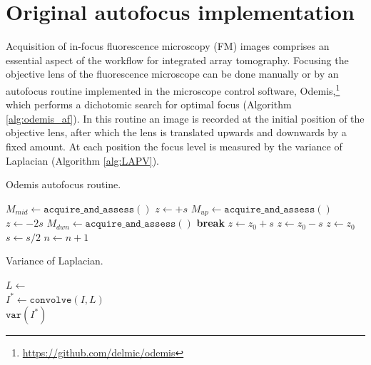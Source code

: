 \section{Original autofocus implementation}
\label{sec:A.1_title}

Acquisition of in-focus fluorescence microscopy (FM) images comprises an essential aspect of the workflow for integrated array tomography. Focusing the objective lens of the fluorescence microscope can be done manually or by an autofocus routine implemented in the microscope control software, Odemis,\footnote{\href{https://github.com/delmic/odemis}{https://github.com/delmic/odemis}} which performs a dichotomic search for optimal focus (Algorithm \ref{alg:odemis_af}). In this routine an image is recorded at the initial position of the objective lens, after which the lens is translated upwards and downwards by a fixed amount. At each position the focus level is measured by the variance of Laplacian (Algorithm \ref{alg:LAPV}). 

\begin{algorithm}
    \caption{Odemis autofocus routine.}
    \label{alg:odemis_af}
    \begin{algorithmic}
        \State $M_{mid} \gets \texttt{acquire\_and\_assess}()$
        \State $z \gets +s$ 
        \State $M_{up} \gets \texttt{acquire\_and\_assess}()$
        \State $z \gets  -2s$ 
        \State $M_{dwn} \gets \texttt{acquire\_and\_assess}()$
         
            \State \textbf{break}
            \State $z \gets z_0+s$
            \State $z \gets z_0-s$
        \Else {}
            \State $z \gets z_0$
            \State $s \gets s/2$ 
        \EndIf
        \State $n \gets n + 1$
        \EndWhile
    \end{algorithmic}
\end{algorithm}


\begin{algorithm}
    \caption{Variance of Laplacian.}
    \label{alg:LAPV}
    \newsavebox\LAP
    \begin{algorithmic}
        \State $L \gets $ \usebox{\LAP}  \\
        \State $I^{*} \gets \texttt{convolve}(I, L)$ \\
        \vspace{0.2em}
        \Return $\texttt{var}(I^{*})$
    \end{algorithmic}
\end{algorithm}


